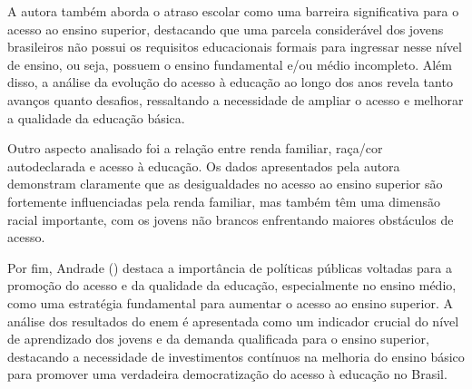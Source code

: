 A autora também aborda o atraso escolar como uma barreira significativa para o acesso ao ensino superior, destacando que uma parcela considerável dos jovens brasileiros não possui os requisitos educacionais formais para ingressar nesse nível de ensino, ou seja, possuem o ensino fundamental e/ou médio incompleto. Além disso, a análise da evolução do acesso à educação ao longo dos anos revela tanto avanços quanto desafios, ressaltando a necessidade de ampliar o acesso e melhorar a qualidade da educação básica.

Outro aspecto analisado foi a relação entre renda familiar, raça/cor autodeclarada e acesso à educação. Os dados apresentados pela autora demonstram claramente que as desigualdades no acesso ao ensino superior são fortemente influenciadas pela renda familiar, mas também têm uma dimensão racial importante, com os jovens não brancos enfrentando maiores obstáculos de acesso.

Por fim, Andrade (\citeyear{de2012acesso}) destaca a importância de políticas públicas voltadas para a promoção do acesso e da qualidade da educação, especialmente no ensino médio, como uma estratégia fundamental para aumentar o acesso ao ensino superior. A análise dos resultados do \ac{enem} é apresentada como um indicador crucial do nível de aprendizado dos jovens e da demanda qualificada para o ensino superior, destacando a necessidade de investimentos contínuos na melhoria do ensino básico para promover uma verdadeira democratização do acesso à educação no Brasil.
